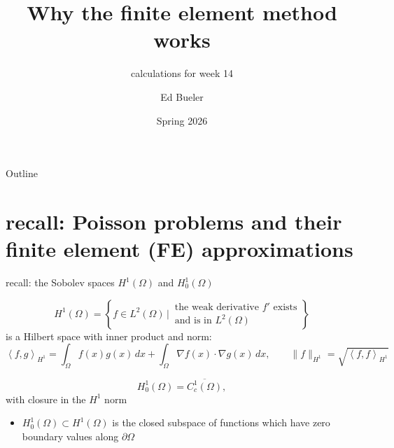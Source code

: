 \documentclass[10pt,
               svgnames,
               hyperref={colorlinks,
                         citecolor=DeepPink4,
                         linkcolor=FireBrick,
                         urlcolor=blue},
               usepdftitle=false]{beamer}
\title[Why the FE method works]{Why the finite element method works}
\subtitle{calculations for week 14}
\author{Ed Bueler}
\institute[]{UAF Math 617 Functional Analysis}
\date{Spring 2026}
\newcommand{\grad}{\nabla}
\newcommand{\ip}[2]{\left<#1,#2\right>}
\begin{document}
\beamertemplatenavigationsymbolsempty

\begin{frame}
  \maketitle
\end{frame}


\begin{frame}{Outline}
  \tableofcontents[hideallsubsections]
\end{frame}

\AtBeginSection[]
{%
}


\section{recall: Poisson problems and their finite element (FE) approximations}

\begin{frame}{recall: the Sobolev spaces $H^1(\Omega)$ and $H_0^1(\Omega)$}

\begin{definition}
    $$H^1(\Omega) = \left\{f\in L^2(\Omega) \,\Big|\, \begin{matrix} \text{the weak derivative } f' \text{ exists} \\ \text{and is in } L^2(\Omega)\end{matrix}\right\}$$
is a Hilbert space with inner product and norm:
	$$\ip{f}{g}_{H^1} = \int_\Omega f(x) g(x)\,dx + \int_\Omega \grad f(x)\cdot \grad g(x)\,dx, \qquad \|f\|_{H^1} = \sqrt{\ip{f}{f}_{H^1}}$$
\end{definition}

\begin{definition}
    $$H_0^1(\Omega) = \overline{C_c^1(\Omega)},$$
with closure in the $H^1$ norm
\end{definition}

\begin{itemize}
\item $H_0^1(\Omega)\subset H^1(\Omega)$ is the closed subspace of functions which have zero boundary values along $\partial \Omega$
\end{itemize}
\end{frame}
\end{document}
